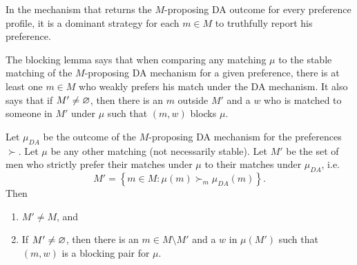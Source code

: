 \begin{theorem} \label{5-11-1}
	In the mechanism that returns the $M$-proposing DA outcome for every preference profile, it is a dominant strategy for each $m \in M$ to truthfully report his preference.
\end{theorem}

The blocking lemma says that when comparing any matching $\mu$ to the stable matching of the $M$-proposing DA mechanism for a given preference, there is at least one $m \in M$ who weakly prefers his match under the DA mechanism. It also says that if $M' \ne \varnothing$, then there is an $m$ outside $M'$ and a $w$ who is matched to someone in $M'$ under $\mu$ such that $(m,w)$ blocks $\mu$.

\begin{lemma}[Blocking]
	Let $\mu_{DA}$ be the outcome of the $M$-proposing DA mechanism for the preferences $\succ$. 
	Let $\mu$ be any other matching (not necessarily stable). Let $M'$ be the set of men who strictly prefer their matches under $\mu$ to their matches under $\mu_{DA}$, i.e. \[
		M' = \left\{m \in M : \mu(m) \succ_m \mu_{DA}(m)\right\}
	.\]  Then
	\begin{enumerate}[label = (\roman*)]
		\item $M' \ne M$, and 
		\item If $M' \ne \varnothing$, then there is an $m \in M \setminus M'$ and a $w$ in $\mu(M')$ such that $(m,w)$ is a blocking pair for $\mu$.
	\end{enumerate} 
\end{lemma}
